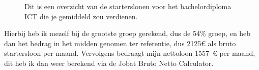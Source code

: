 \begin{figure}[tbph!]
	\centering
	\caption[Startersloon overzicht voor bachelor diploma ICT]{Dit is een overzicht van de starterslonen voor het bachelordiploma ICT die je gemiddeld zou verdienen.}
	\label{fig:startersloonictbachelor}
\end{figure}
\newpage
Hierbij heb ik mezelf bij de grootste groep gerekend, dus de 54\% groep, en heb dan het bedrag in het midden genomen ter referentie, dus 2125\euro{} als bruto startersloon per maand. Vervolgens bedraagt mijn nettoloon 1557~\euro{} per maand, dit heb ik dan weer berekend via de Jobat Bruto Netto Calculator\cite{Jobatvoo94}.










